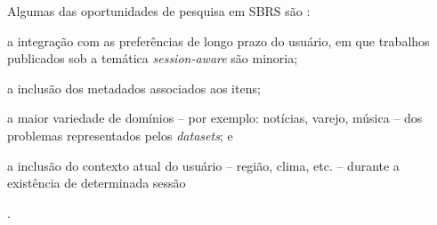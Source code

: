  Algumas das oportunidades de pesquisa em SBRS são \cite{rec_sys_handbook_2022}:
 \begin{inparaenum}[(1)]
     \item a integração com as preferências de longo prazo do usuário, em que
     trabalhos publicados sob a temática \textit{session-aware} são minoria;
     \item a inclusão dos metadados associados aos itens;
     \item a maior variedade de domínios -- por exemplo: notícias, varejo,
     música -- dos problemas representados pelos \textit{datasets}; e
     \item a inclusão do contexto atual do usuário -- região, clima, etc. --
     durante a existência de determinada sessão\end{inparaenum}.

     


